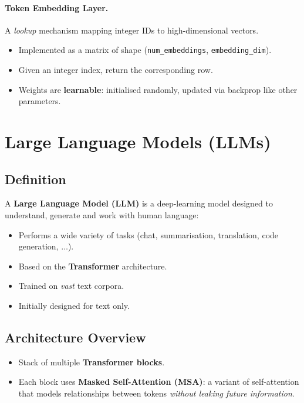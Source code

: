 \documentclass[11pt,a4paper]{article}
\theoremstyle{definition}
\theoremstyle{plain}
\theoremstyle{remark}
\begin{document}
\paragraph{Token Embedding Layer.} A \emph{lookup} mechanism mapping integer IDs to high-dimensional vectors.
\begin{itemize}
    \item Implemented as a matrix of shape (\texttt{num\_embeddings}, \texttt{embedding\_dim}).
    \item Given an integer index, return the corresponding row.
    \item Weights are \textbf{learnable}: initialised randomly, updated via backprop like other parameters.
\end{itemize}


\section{Large Language Models (LLMs)}

\subsection{Definition}

A \textbf{Large Language Model (LLM)} is a deep-learning model designed to understand, generate and work with human language:
\begin{itemize}
    \item Performs a wide variety of tasks (chat, summarisation, translation, code generation, $\ldots$).
    \item Based on the \textbf{Transformer} architecture.
    \item Trained on \emph{vast} text corpora.
    \item Initially designed for text only.
\end{itemize}

\subsection{Architecture Overview}

\begin{itemize}
    \item Stack of multiple \textbf{Transformer blocks}.
    \item Each block uses \textbf{Masked Self-Attention (MSA)}: a variant of self-attention that models relationships between tokens \emph{without leaking future information}.
\end{itemize}
\end{document}

